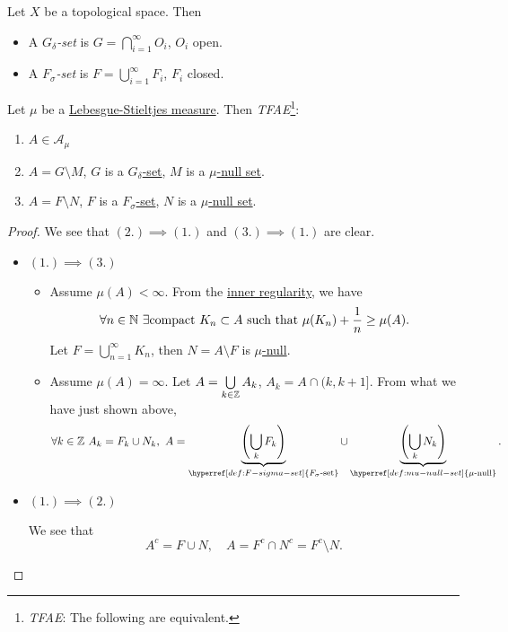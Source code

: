 \begin{definition}
	Let \(X\) be a topological space. Then
	\begin{itemize}
		\item\label{def:G-delta-set} A \emph{\(G_{\delta}\)-set} is \(G = \bigcap\limits_{i=1}^{\infty} O_{i}\), \(O_{i}\) open.
		\item\label{def:F-sigma-set} A \emph{\(F_{\sigma}\)-set} is \(F = \bigcup\limits_{i=1}^{\infty} F_{i}\), \(F_{i}\) closed.
	\end{itemize}
\end{definition}

\begin{theorem}
	Let \(\mu \) be a \hyperref[def:Lebesgue-Stieltjes-measure]{Lebesgue-Stieltjes measure}. Then \emph{TFAE}\footnote{\emph{TFAE}: The following are equivalent.}:
	\begin{enumerate}
		\item \(A\in \mathcal{A} _\mu \)
		\item \(A = G\setminus M\), \(G\) is a \hyperref[def:G-delta-set]{\(G_{\delta}\)-set}, \(M\) is a \hyperref[def:mu-null-set]{\(\mu\)-null set}.
		\item \(A = F\setminus N\), \(F\) is a \hyperref[def:F-sigma-set]{\(F_{\sigma}\)-set}, \(N\) is a \hyperref[def:mu-null-set]{\(\mu\)-null set}.
	\end{enumerate}
\end{theorem}
\begin{proof}
	We see that \((2.) \implies (1.)\) and \((3.)\implies (1.)\) are clear.
	\begin{itemize}
		\item \((1.)\implies (3.)\)
		      \begin{itemize}
			      \item Assume \(\mu (A)<\infty \). From the \hyperref[thm:inner-regularity]{inner regularity}, we have
			            \[
				            \forall n\in\mathbb{\MakeUppercase{n}} \ \exists \text{compact }K_{n}\subset A\text{ such that } \mu (K_{n}) + \frac{1}{n} \geq \mu (A).
			            \]
			            Let \(F = \bigcup\limits_{n=1}^{\infty} K_{n}\), then \(N = A\setminus F\) is \hyperref[def:mu-null-set]{\(\mu\)-null}.
			      \item Assume \(\mu (A) = \infty \). Let \(A = \bigcup\limits_{k\in\mathbb{\MakeUppercase{z}} } A_{k}\), \(A_{k} = A\cap (k, k+1]\). From what we
			            have just shown above,
			            \[
				            \forall k\in\mathbb{\MakeUppercase{z}}\ A_{k} = F_{k}\cup N_{k},\ A = \underbrace{\left(\bigcup\limits_{k}F_{k} \right)}_{\hyperref[def:F-sigma-set]{F_{\sigma}\text{-set}}}\cup \underbrace{\left(\bigcup\limits_{k}N_{k}\right)}_{\hyperref[def:mu-null-set]{\mu\text{-null}}}.
			            \]
		      \end{itemize}
		\item \((1.)\implies (2.)\)
		      \par We see that
		      \[
			      A^{c} = F\cup N,\quad A = F^{c} \cap N^{c} = F^{c} \setminus N.
		      \]
	\end{itemize}
\end{proof}

